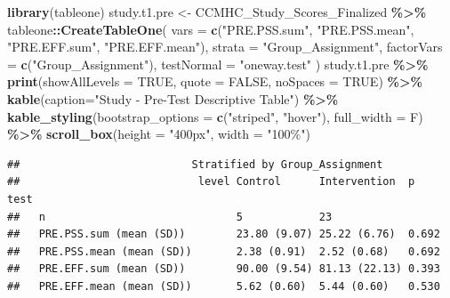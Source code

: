 \documentclass[
]{article}
\newenvironment{Shaded}{\begin{snugshade}}{\end{snugshade}}
\newcommand{\AttributeTok}[1]{\textcolor[rgb]{0.13,0.29,0.53}{#1}}
\newcommand{\ConstantTok}[1]{\textcolor[rgb]{0.56,0.35,0.01}{#1}}
\newcommand{\FunctionTok}[1]{\textcolor[rgb]{0.13,0.29,0.53}{\textbf{#1}}}
\newcommand{\NormalTok}[1]{#1}
\newcommand{\OtherTok}[1]{\textcolor[rgb]{0.56,0.35,0.01}{#1}}
\newcommand{\SpecialCharTok}[1]{\textcolor[rgb]{0.81,0.36,0.00}{\textbf{#1}}}
\newcommand{\StringTok}[1]{\textcolor[rgb]{0.31,0.60,0.02}{#1}}
\begin{document}
\begin{Shaded}
\begin{Highlighting}[]
\FunctionTok{library}\NormalTok{(tableone)}
\NormalTok{study.t1.pre }\OtherTok{\textless{}{-}} 
\NormalTok{  CCMHC\_Study\_Scores\_Finalized }\SpecialCharTok{\%\textgreater{}\%} 
\NormalTok{tableone}\SpecialCharTok{::}\FunctionTok{CreateTableOne}\NormalTok{(}
  \AttributeTok{vars =} \FunctionTok{c}\NormalTok{(}\StringTok{"PRE.PSS.sum"}\NormalTok{, }\StringTok{"PRE.PSS.mean"}\NormalTok{, }\StringTok{"PRE.EFF.sum"}\NormalTok{, }\StringTok{"PRE.EFF.mean"}\NormalTok{),}
  \AttributeTok{strata =} \StringTok{"Group\_Assignment"}\NormalTok{,}
  \AttributeTok{factorVars =} \FunctionTok{c}\NormalTok{(}\StringTok{"Group\_Assignment"}\NormalTok{),}
  \AttributeTok{testNormal =} \StringTok{"oneway.test"}
\NormalTok{) }
\NormalTok{study.t1.pre }\SpecialCharTok{\%\textgreater{}\%}   \FunctionTok{print}\NormalTok{(}\AttributeTok{showAllLevels =} \ConstantTok{TRUE}\NormalTok{, }\AttributeTok{quote =} \ConstantTok{FALSE}\NormalTok{, }\AttributeTok{noSpaces =} \ConstantTok{TRUE}\NormalTok{) }\SpecialCharTok{\%\textgreater{}\%} 
  \FunctionTok{kable}\NormalTok{(}\AttributeTok{caption=}\StringTok{"Study {-} Pre{-}Test Descriptive Table"}\NormalTok{) }\SpecialCharTok{\%\textgreater{}\%} 
  \FunctionTok{kable\_styling}\NormalTok{(}\AttributeTok{bootstrap\_options =} \FunctionTok{c}\NormalTok{(}\StringTok{"striped"}\NormalTok{, }\StringTok{"hover"}\NormalTok{), }\AttributeTok{full\_width =}\NormalTok{ F) }\SpecialCharTok{\%\textgreater{}\%}    \FunctionTok{scroll\_box}\NormalTok{(}\AttributeTok{height =} \StringTok{"400px"}\NormalTok{, }\AttributeTok{width =} \StringTok{"100\%"}\NormalTok{)}
\end{Highlighting}
\end{Shaded}

\begin{verbatim}
##                           Stratified by Group_Assignment
##                            level Control      Intervention  p     test
##   n                              5            23                      
##   PRE.PSS.sum (mean (SD))        23.80 (9.07) 25.22 (6.76)  0.692     
##   PRE.PSS.mean (mean (SD))       2.38 (0.91)  2.52 (0.68)   0.692     
##   PRE.EFF.sum (mean (SD))        90.00 (9.54) 81.13 (22.13) 0.393     
##   PRE.EFF.mean (mean (SD))       5.62 (0.60)  5.44 (0.60)   0.530
\end{verbatim}
\end{document}
